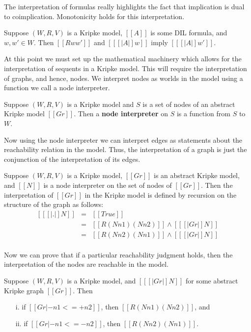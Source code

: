 The interpretation of formulas really highlights the fact that implication is dual to coimplication.  Monotonicity
holds for this interpretation.

\begin{lemma}[Monotonicity]
  \label{lemma:monotonicity}
  Suppose $(W, R, V)$ is a Kripke model, $[[A]]$ is some DIL formula, and $w,w' \in W$.
  Then $[[R w w']]$ and $[[ [| A |] w]]$ imply $[[ [| A |] w']]$.
\end{lemma}

At this point we must set up the mathematical machinery which allows
for the interpretation of sequents in a Kripke model.  This will
require the interpretation of graphs, and hence, nodes.  We interpret
nodes as worlds in the model using a function we call a node
interpreter.
\begin{definition}
  \label{def:node_interpreter}
  Suppose $(W, R, V)$ is a Kripke model and $S$ is a set of nodes of
  an abstract Kripke model $[[Gr]]$.  Then a \textbf{node interpreter} on
  $S$ is a function from $S$ to $W$.
\end{definition}
Now using the node interpreter we can interpret edges as statements
about the reachability relation in the model.  Thus, the
interpretation of a graph is just the conjunction of the
interpretation of its edges.
\begin{definition}
  \label{def:graph_interp}
  Suppose $(W, R, V)$ is a Kripke model, $[[Gr]]$ is an abstract Kripke
  model, and $[[N]]$ is a node interpreter on the set of nodes of $[[Gr]]$.
  Then the interpretation of
  $[[Gr]]$ in the Kripke model is defined by recursion on the structure
  of the graph as follows:
  \[
  \begin{array}{lll}
    [[ [| . |] N ]]            & = & [[True]]\\
    [[ [| n1 <=+ n2, Gr |] N]] & = & [[R (N n1) (N n2)]] \land [[ [| Gr |] N]]\\
    [[ [| n1 <=- n2, Gr |] N]] & = & [[R (N n2) (N n1)]] \land [[ [| Gr |] N]]\\
  \end{array}
  \]
\end{definition}
Now we can prove that if a particular reachability judgment holds,
then the interpretation of the nodes are reachable in the model.
\begin{lemma}
  \label{lemma:reachability_interpretation}
  Suppose $(W, R, V)$ is a Kripke model, and $[[ [| Gr |] N]]$ for some abstract Kripke graph $[[Gr]]$. Then
  \begin{itemize}
  \item[i.] if $[[Gr |- n1 <=+ n2]]$, then $[[R (N n1) (N n2)]]$, and
  \item[ii.] if $[[Gr |- n1 <=- n2]]$, then $[[R (N n2) (N n1)]]$.
  \end{itemize}
\end{lemma}

